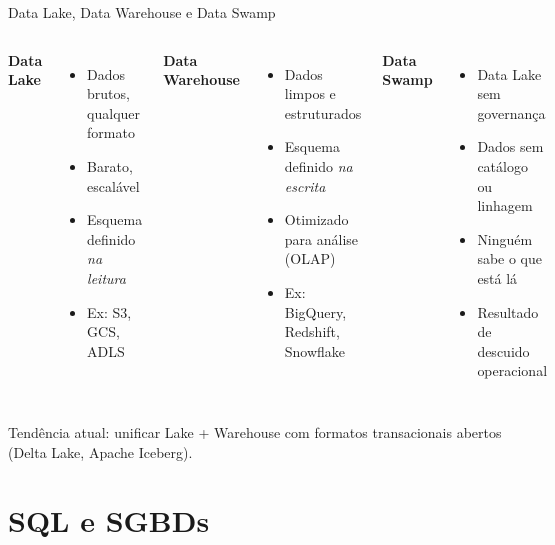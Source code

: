 \documentclass[xcolor=dvipsnames,t,aspectratio=169]{beamer}
\newcommand{\highlight}[1]{{\color{nes_dark_orange} #1}}
\begin{document}
\begin{frame}[c]{Data Lake, Data Warehouse e Data Swamp}

\begin{columns}
\textbf{\color{nes_dark_purple}Data Lake}
\begin{itemize}
    \item Dados brutos, qualquer formato
    \item Barato, escalável
    \item Esquema definido \emph{na leitura}
    \item Ex: S3, GCS, ADLS
\end{itemize}

\textbf{\color{nes_dark_purple}Data Warehouse}
\begin{itemize}
    \item Dados limpos e estruturados
    \item Esquema definido \emph{na escrita}
    \item Otimizado para análise (OLAP)
    \item Ex: BigQuery, Redshift, Snowflake
\end{itemize}

\textbf{\color{nes_dark_purple}Data Swamp}
\begin{itemize}
    \item Data Lake \highlight{sem governança}
    \item Dados sem catálogo ou linhagem
    \item Ninguém sabe o que está lá
    \item Resultado de descuido operacional
\end{itemize}
\end{columns}

\vspace{0.8em}

\begin{display}[Lakehouse]
Tendência atual: unificar Lake + Warehouse com formatos transacionais abertos (Delta Lake, Apache Iceberg).
\end{display}

\end{frame}


\section{SQL e SGBDs}
\end{document}
